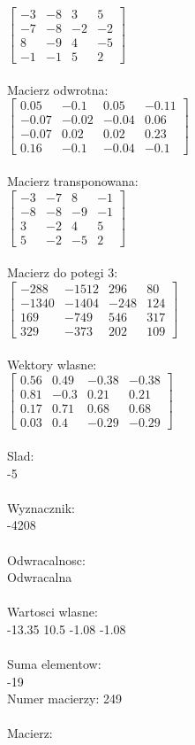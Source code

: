 \documentclass[a4paper,12pt]{article}
\begin{document}
$\begin{bmatrix} -3&-8&3&5\\-7&-8&-2&-2\\8&-9&4&-5\\-1&-1&5&2 \end{bmatrix}$
\\
\\
Macierz odwrotna:\\

$\begin{bmatrix} 0.05&-0.1&0.05&-0.11\\-0.07&-0.02&-0.04&0.06\\-0.07&0.02&0.02&0.23\\0.16&-0.1&-0.04&-0.1 \end{bmatrix}$
\\
\\
Macierz transponowana:\\

$\begin{bmatrix} -3&-7&8&-1\\-8&-8&-9&-1\\3&-2&4&5\\5&-2&-5&2 \end{bmatrix}$
\\
\\
Macierz do potegi 3:\\

$\begin{bmatrix} -288&-1512&296&80\\-1340&-1404&-248&124\\169&-749&546&317\\329&-373&202&109 \end{bmatrix}$
\\
\\
Wektory wlasne:\\

$\begin{bmatrix} 0.56&0.49&-0.38&-0.38\\0.81&-0.3&0.21&0.21\\0.17&0.71&0.68&0.68\\0.03&0.4&-0.29&-0.29 \end{bmatrix}$
\\
\\
Slad:\\
-5
\\
\\
Wyznacznik:\\
-4208
\\
\\
Odwracalnosc:\\
Odwracalna
\\
\\
Wartosci wlasne:\\
-13.35 10.5 -1.08 -1.08
\\
\\
Suma elementow:\\
-19
\\
\newpage
Numer macierzy:
249
\\
\\
Macierz:\\
\end{document}
